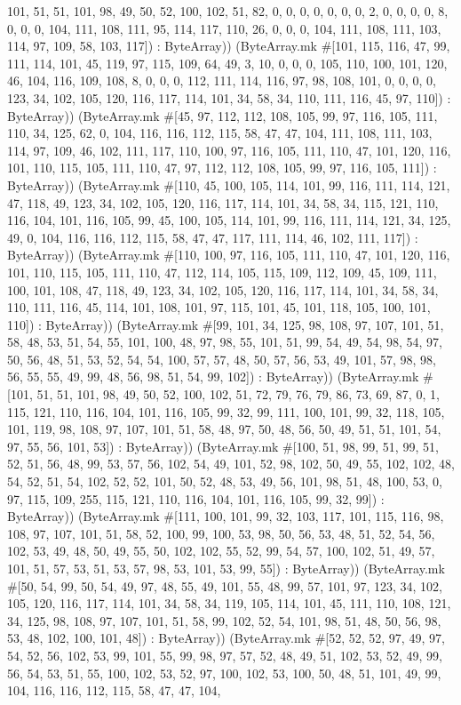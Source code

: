 \documentclass[11pt]{article}
\begin{document}
101, 51, 51, 101, 98, 49, 50, 52, 100, 102, 51, 82, 0, 0, 0, 0, 0, 0, 0, 2, 0, 0, 0, 0, 8, 0, 0, 0, 104, 111, 108, 111, 95, 114, 117, 110, 26, 0, 0, 0, 104, 111, 108, 111, 103, 114, 97, 109, 58, 103, 117]) : ByteArray)) (ByteArray.mk \#[101, 115, 116, 47, 99, 111, 114, 101, 45, 119, 97, 115, 109, 64, 49, 3, 10, 0, 0, 0, 105, 110, 100, 101, 120, 46, 104, 116, 109, 108, 8, 0, 0, 0, 112, 111, 114, 116, 97, 98, 108, 101, 0, 0, 0, 0, 123, 34, 102, 105, 120, 116, 117, 114, 101, 34, 58, 34, 110, 111, 116, 45, 97, 110]) : ByteArray)) (ByteArray.mk \#[45, 97, 112, 112, 108, 105, 99, 97, 116, 105, 111, 110, 34, 125, 62, 0, 104, 116, 116, 112, 115, 58, 47, 47, 104, 111, 108, 111, 103, 114, 97, 109, 46, 102, 111, 117, 110, 100, 97, 116, 105, 111, 110, 47, 101, 120, 116, 101, 110, 115, 105, 111, 110, 47, 97, 112, 112, 108, 105, 99, 97, 116, 105, 111]) : ByteArray)) (ByteArray.mk \#[110, 45, 100, 105, 114, 101, 99, 116, 111, 114, 121, 47, 118, 49, 123, 34, 102, 105, 120, 116, 117, 114, 101, 34, 58, 34, 115, 121, 110, 116, 104, 101, 116, 105, 99, 45, 100, 105, 114, 101, 99, 116, 111, 114, 121, 34, 125, 49, 0, 104, 116, 116, 112, 115, 58, 47, 47, 117, 111, 114, 46, 102, 111, 117]) : ByteArray)) (ByteArray.mk \#[110, 100, 97, 116, 105, 111, 110, 47, 101, 120, 116, 101, 110, 115, 105, 111, 110, 47, 112, 114, 105, 115, 109, 112, 109, 45, 109, 111, 100, 101, 108, 47, 118, 49, 123, 34, 102, 105, 120, 116, 117, 114, 101, 34, 58, 34, 110, 111, 116, 45, 114, 101, 108, 101, 97, 115, 101, 45, 101, 118, 105, 100, 101, 110]) : ByteArray)) (ByteArray.mk \#[99, 101, 34, 125, 98, 108, 97, 107, 101, 51, 58, 48, 53, 51, 54, 55, 101, 100, 48, 97, 98, 55, 101, 51, 99, 54, 49, 54, 98, 54, 97, 50, 56, 48, 51, 53, 52, 54, 54, 100, 57, 57, 48, 50, 57, 56, 53, 49, 101, 57, 98, 98, 56, 55, 55, 49, 99, 48, 56, 98, 51, 54, 99, 102]) : ByteArray)) (ByteArray.mk \#[101, 51, 51, 101, 98, 49, 50, 52, 100, 102, 51, 72, 79, 76, 79, 86, 73, 69, 87, 0, 1, 115, 121, 110, 116, 104, 101, 116, 105, 99, 32, 99, 111, 100, 101, 99, 32, 118, 105, 101, 119, 98, 108, 97, 107, 101, 51, 58, 48, 97, 50, 48, 56, 50, 49, 51, 51, 101, 54, 97, 55, 56, 101, 53]) : ByteArray)) (ByteArray.mk \#[100, 51, 98, 99, 51, 99, 51, 52, 51, 56, 48, 99, 53, 57, 56, 102, 54, 49, 101, 52, 98, 102, 50, 49, 55, 102, 102, 48, 54, 52, 51, 54, 102, 52, 52, 101, 50, 52, 48, 53, 49, 56, 101, 98, 51, 48, 100, 53, 0, 97, 115, 109, 255, 115, 121, 110, 116, 104, 101, 116, 105, 99, 32, 99]) : ByteArray)) (ByteArray.mk \#[111, 100, 101, 99, 32, 103, 117, 101, 115, 116, 98, 108, 97, 107, 101, 51, 58, 52, 100, 99, 100, 53, 98, 50, 56, 53, 48, 51, 52, 54, 56, 102, 53, 49, 48, 50, 49, 55, 50, 102, 102, 55, 52, 99, 54, 57, 100, 102, 51, 49, 57, 101, 51, 57, 53, 51, 53, 57, 98, 53, 101, 53, 99, 55]) : ByteArray)) (ByteArray.mk \#[50, 54, 99, 50, 54, 49, 97, 48, 55, 49, 101, 55, 48, 99, 57, 101, 97, 123, 34, 102, 105, 120, 116, 117, 114, 101, 34, 58, 34, 119, 105, 114, 101, 45, 111, 110, 108, 121, 34, 125, 98, 108, 97, 107, 101, 51, 58, 99, 102, 52, 54, 101, 98, 51, 48, 50, 56, 98, 53, 48, 102, 100, 101, 48]) : ByteArray)) (ByteArray.mk \#[52, 52, 52, 97, 49, 97, 54, 52, 56, 102, 53, 99, 101, 55, 99, 98, 97, 57, 52, 48, 49, 51, 102, 53, 52, 49, 99, 56, 54, 53, 51, 55, 100, 102, 53, 52, 97, 100, 102, 53, 100, 50, 48, 51, 101, 49, 99, 104, 116, 116, 112, 115, 58, 47, 47, 104, 
\end{document}
